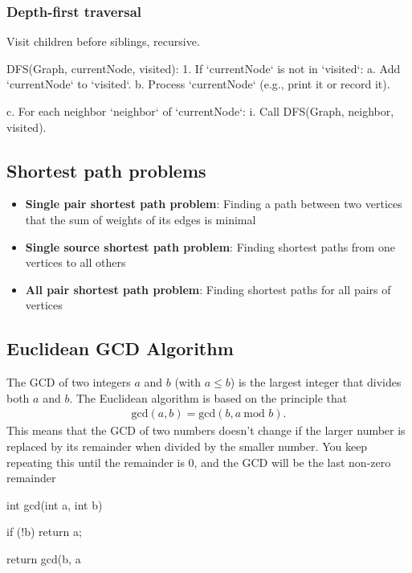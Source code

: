 \documentclass{report}
\begin{document}
\bigbreak \noindent 
\subsubsection{Depth-first traversal}
\bigbreak \noindent 
Visit children before siblings, recursive.
\bigbreak \noindent 
\begin{cppcode}
DFS(Graph, currentNode, visited):
    1. If `currentNode` is not in `visited`:
        a. Add `currentNode` to `visited`.
        b. Process `currentNode` (e.g., print it or record it).

        c. For each neighbor `neighbor` of `currentNode`:
            i. Call DFS(Graph, neighbor, visited).
\end{cppcode}

\bigbreak \noindent 
\subsection{Shortest path problems}
\bigbreak \noindent 
\begin{itemize}
    \item \textbf{Single pair shortest path problem}: Finding a path between two vertices that the sum of weights of its edges is minimal
    \item \textbf{Single source shortest path problem}: Finding shortest paths from one vertices to all others
    \item \textbf{All pair shortest path problem}: Finding shortest paths for all pairs of vertices
\end{itemize}





\pagebreak 
{}
\bigbreak \noindent 
\subsection{Euclidean GCD Algorithm}
\bigbreak \noindent 
The GCD of two integers $a$ and $b$ (with $a \leq b$) is the largest integer that divides both $a$ and $b$. The Euclidean algorithm is based on the principle that
\begin{align*}
    \text{gcd}(a,b) = \text{gcd}(b, a\ \text{mod } b)
.\end{align*}
\bigbreak \noindent 
This means that the GCD of two numbers doesn't change if the larger number is replaced by its remainder when divided by the smaller number. You keep repeating this until the remainder is 0, and the GCD will be the last non-zero remainder
\bigbreak \noindent 
\begin{cppcode}
    int gcd(int a, int b)  {
        if (!b) return a;

        return gcd(b, a%
    }
\end{cppcode}
\end{document}

